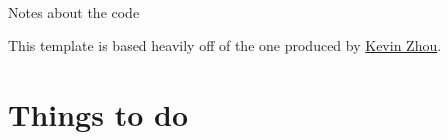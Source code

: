 \documentclass[11pt]{article}
\begin{document}
\thispagestyle{empty}
\bigskip \
\vspace{0.1cm}

\begin{center}

{\fontsize{22}{22} \selectfont Notes about the code}
\vskip 16pt
\end{center}



\vskip 0.5cm
This template is based heavily off of the one produced by \href{https://knzhou.github.io/}{Kevin Zhou}.

\tableofcontents 


\newpage
\section{Things to do}
\end{document}
